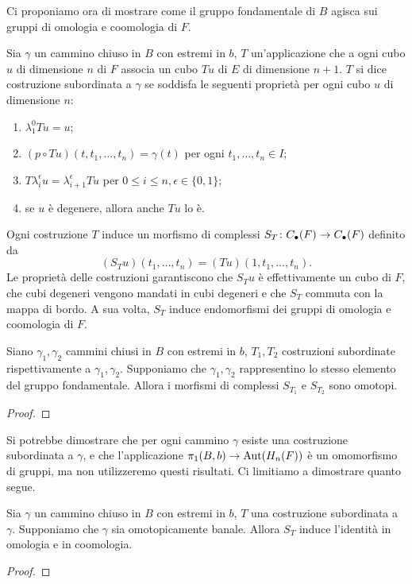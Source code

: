 Ci proponiamo ora di mostrare come il gruppo fondamentale di $B$ agisca sui gruppi di omologia e coomologia di $F$.

\begin{definition}
Sia $\gamma$ un cammino chiuso in $B$ con estremi in $b$, $T$ un'applicazione che a ogni cubo $u$ di dimensione $n$ di $F$ associa un cubo $Tu$ di $E$ di dimensione $n+1$. $T$ si dice costruzione subordinata a $\gamma$ se soddisfa le seguenti proprietà per ogni cubo $u$ di dimensione $n$:
\begin{enumerate}
\item $\lambda^0_1 Tu=u$;
\item $(p\circ Tu)(t,t_1,\ldots,t_n)=\gamma(t)$ per ogni $t_1,\ldots,t_n\in I$;
\item $T\lambda^\epsilon_iu=\lambda^\epsilon_{i+1}Tu$ per $0\le i\le n,\epsilon\in\{0,1\}$;
\item se $u$ è degenere, allora anche $Tu$ lo è.
\end{enumerate}
\end{definition}
Ogni costruzione $T$ induce un morfismo di complessi $S_T\colon C_\bullet(F)\to C_\bullet(F)$ definito da 
$$
(S_Tu)(t_1,\ldots,t_n)=(Tu)(1,t_1,\ldots,t_n).
$$
Le proprietà delle costruzioni garantiscono che $S_Tu$ è effettivamente un cubo di $F$, che cubi degeneri vengono mandati in cubi degeneri e che $S_T$ commuta con la mappa di bordo. A sua volta, $S_T$ induce endomorfismi dei gruppi di omologia e coomologia di $F$.
\begin{proposition}
Siano $\gamma_1,\gamma_2$ cammini chiusi in $B$ con estremi in $b$, $T_1,T_2$ costruzioni subordinate rispettivamente a $\gamma_1,\gamma_2$. Supponiamo che $\gamma_1,\gamma_2$ rappresentino lo stesso elemento del gruppo fondamentale. Allora i morfismi di complessi $S_{T_1}$ e $S_{T_2}$ sono omotopi.
\end{proposition}
\begin{proof}

\end{proof}
Si potrebbe dimostrare che per ogni cammino $\gamma$ esiste una costruzione subordinata a $\gamma$, e che l'applicazione $\pi_1(B,b)\to\operatorname{Aut}(H_n(F))$ è un omomorfismo di gruppi, ma non utilizzeremo questi risultati.  
Ci limitiamo a dimostrare quanto segue.
\begin{proposition}
Sia $\gamma$ un cammino chiuso in $B$ con estremi in $b$, $T$ una costruzione subordinata a $\gamma$. Supponiamo che $\gamma$ sia omotopicamente banale. Allora $S_T$ induce l'identità in omologia e in coomologia.
\end{proposition}
\begin{proof}

\end{proof}

